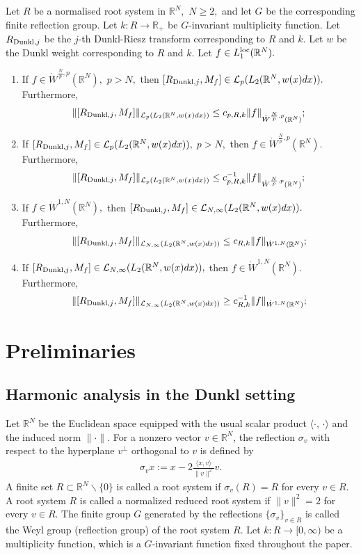 \documentclass{amsart}
\begin{document}
\begin{theorem}\label{main theorem} Let $R$ be a normalised root system in $\mathbb{R}^N,$ $N\geq 2,$ and let $G$ be the corresponding finite reflection group. Let $k:R\to\mathbb{R}_+$ be $G$-invariant multiplicity function. Let $R_{{\rm Dunkl},j}$ be the $j$-th Dunkl-Riesz transform corresponding to $R$ and $k.$ Let $w$ be the Dunkl weight corresponding to $R$ and $k.$ Let $f\in L_1^{{\rm loc}}(\mathbb{R}^N).$
\begin{enumerate}[{\rm (i)}]
\item\label{mta} If $f\in\dot{W}^{\frac{N}{p},p}(\mathbb{R}^N),$ $p>N,$ then $[R_{{\rm Dunkl},j},M_f]\in\mathcal{L}_p(L_2(\mathbb{R}^N,w(x)dx)).$ Furthermore,
$$\|[R_{{\rm Dunkl},j},M_f]\|_{\mathcal{L}_p(L_2(\mathbb{R}^N,w(x)dx))}\leq c_{p,R,k}\|f\|_{\dot{W}^{\frac{N}{p},p}(\mathbb{R}^N)};$$
\item\label{mtb} If $[R_{{\rm Dunkl},j},M_f]\in\mathcal{L}_p(L_2(\mathbb{R}^N,w(x)dx)),$ $p>N,$ then $f\in\dot{W}^{\frac{N}{p},p}(\mathbb{R}^N).$ Furthermore,
$$\|[R_{{\rm Dunkl},j},M_f]\|_{\mathcal{L}_p(L_2(\mathbb{R}^N,w(x)dx))}\leq c_{p,R,k}^{-1}\|f\|_{\dot{W}^{\frac{N}{p},p}(\mathbb{R}^N)};$$
\item\label{mtc} If $f\in\dot{W}^{1,N}(\mathbb{R}^N),$ then $[R_{{\rm Dunkl},j},M_f]\in\mathcal{L}_{N,\infty}(L_2(\mathbb{R}^N,w(x)dx)).$ Furthermore,
$$\|[R_{{\rm Dunkl},j},M_f]\|_{\mathcal{L}_{N,\infty}(L_2(\mathbb{R}^N,w(x)dx))}\leq c_{R,k}\|f\|_{\dot{W}^{1,N}(\mathbb{R}^N)};$$
\item\label{mtd} If $[R_{{\rm Dunkl},j},M_f]\in\mathcal{L}_{N,\infty}(L_2(\mathbb{R}^N,w(x)dx)),$ then $f\in\dot{W}^{1,N}(\mathbb{R}^N).$ Furthermore,
$$\|[R_{{\rm Dunkl},j},M_f]\|_{\mathcal{L}_{N,\infty}(L_2(\mathbb{R}^N,w(x)dx))}\geq c_{R,k}^{-1}\|f\|_{\dot{W}^{1,N}(\mathbb{R}^N)};$$
\end{enumerate}
\end{theorem}

\section{Preliminaries}
\setcounter{equation}{0}
\subsection{Harmonic analysis in the Dunkl setting}
Let $\mathbb{R}^N$ be the Euclidean space equipped with the usual scalar product $\langle \cdot,\,\cdot\rangle $ and the induced norm $\|\cdot\|$. For a nonzero vector $v\in \mathbb{R}^N$, the reflection $\sigma_v$ with respect to the hyperplane $v^{\perp}$ orthogonal to $v$ is defined by
\begin{align*}
	\sigma_v x:= x-2\frac{\langle x,v\rangle}{\|v\|^2}v.
\end{align*}
A finite set $R\subset \mathbb{R}^N\backslash \{0\}$ is called a root system if $\sigma_v(R)=R$ for every $v\in R$. A root system $R$ is called a normalized reduced root system if  $\|v\|^2=2$ for every $v\in R$.
The finite group $G$ generated by the reflections $\{\sigma_v\}_{v\in R}$ is called the Weyl group (reflection group) of the root system $R$.
Let $k: R \to [0,\infty)$ be a multiplicity function, which is a $G$-invariant function  fixed throughout the paper. 
\end{document}
